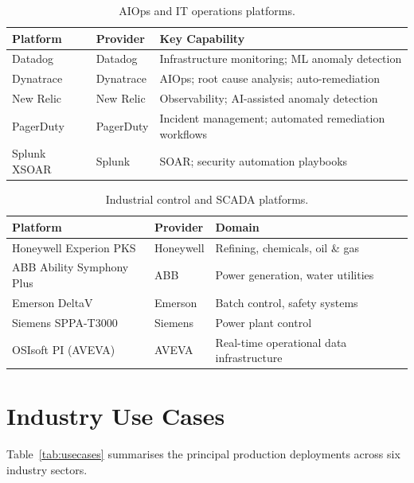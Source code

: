 \documentclass[12pt, a4paper]{article}
\begin{document}
\begin{table}[ht]
\centering
\caption{AIOps and IT operations platforms.}
\label{tab:platforms-aiops}
\begin{tabular}{lll}
\toprule
\textbf{Platform} & \textbf{Provider} & \textbf{Key Capability} \\
\midrule
Datadog       & Datadog    & Infrastructure monitoring; ML anomaly detection \\
Dynatrace     & Dynatrace  & AIOps; root cause analysis; auto-remediation \\
New Relic     & New Relic  & Observability; AI-assisted anomaly detection \\
PagerDuty     & PagerDuty  & Incident management; automated remediation workflows \\
Splunk XSOAR  & Splunk     & SOAR; security automation playbooks \\
\bottomrule
\end{tabular}
\end{table}

\begin{table}[ht]
\centering
\caption{Industrial control and SCADA platforms.}
\label{tab:platforms-scada}
\begin{tabular}{lll}
\toprule
\textbf{Platform} & \textbf{Provider} & \textbf{Domain} \\
\midrule
Honeywell Experion PKS   & Honeywell  & Refining, chemicals, oil \& gas \\
ABB Ability Symphony Plus & ABB       & Power generation, water utilities \\
Emerson DeltaV           & Emerson   & Batch control, safety systems \\
Siemens SPPA-T3000       & Siemens   & Power plant control \\
OSIsoft PI (AVEVA)       & AVEVA     & Real-time operational data infrastructure \\
\bottomrule
\end{tabular}
\end{table}

\section{Industry Use Cases}\label{sec:usecases}

Table~\ref{tab:usecases} summarises the principal production deployments across six industry sectors.
\end{document}
